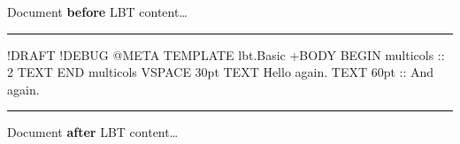 \documentclass[a4paper,11pt]{article}
\begin{document}

  Document \textbf{before} LBT content\dots

  \noindent\rule{\textwidth}{0.5pt}

  \begin{lbt}
    !DRAFT
    !DEBUG
    @META
      TEMPLATE lbt.Basic
    +BODY
      BEGIN multicols :: 2
      TEXT \lipsum[1-5]
      END multicols
      VSPACE 30pt
      TEXT Hello again.
      TEXT 60pt :: And again.
  \end{lbt}

  \noindent\rule{\textwidth}{0.5pt}

  Document \textbf{after} LBT content\dots
\end{document}
